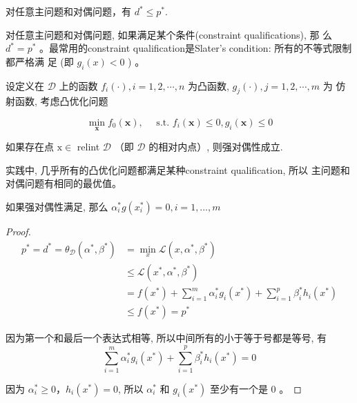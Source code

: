 \begin{theorem}[弱对偶性]
    对任意主问题和对偶问题，有 $ d^{*} \leqslant p^{*} $.
\end{theorem}

\begin{theorem}[强对偶性]
    对任意主问题和对偶问题, 如果满足某个条件(constraint qualifications), 那 么 $ d^{*}=p^{*} $ 。最常用的constraint qualification是Slater's condition: 所有的不等式限制都严格满 足 (即 $ g_{i}(x)<0 $ ) 。
\end{theorem}

\begin{theorem}[Slater 条件]
    设定义在 $ \mathcal{D} $ 上的函数 $ f_{i}(\cdot), i=1,2, \cdots, n $ 为凸函数, $ g_{j}(\cdot), j=1,2, \cdots, m $ 为 仿射函数, 考虑凸优化问题

    $$
    \min _{\mathbf{x}} f_{0}(\mathbf{x}), \quad \text { s.t. } f_{i}(\mathbf{x}) \leq 0, g_{i}(\mathbf{x}) \leq 0
    $$

    如果存在点 $ \mathrm{x} \in $ relint $ \mathcal{D} $ （即 $ \mathcal{D} $ 的相对内点）, 则强对偶性成立.
\end{theorem}

实践中, 几乎所有的凸优化问题都满足某种constraint qualification, 所以 主问题和对偶问题有相同的最优值。

\begin{theorem}
    如果强对偶性满足, 那么 $ \alpha_{i}^{*} g\left(x_{i}^{*}\right)=0, i=1, \ldots, m $
    
\end{theorem}

\begin{proof}
    $$
    \begin{aligned}
    p^{*}=d^{*}=\theta_{\mathcal{D}}\left(\alpha^{*}, \beta^{*}\right) &=\min _{x} \mathcal{L}\left(x, \alpha^{*}, \beta^{*}\right) \\
    & \leqslant \mathcal{L}\left(x^{*}, \alpha^{*}, \beta^{*}\right) \\
    &=f\left(x^{*}\right)+\sum_{i=1}^{m} \alpha_{i}^{*} g_{i}\left(x^{*}\right)+\sum_{i=1}^{p} \beta_{i}^{*} h_{i}\left(x^{*}\right) \\
    & \leqslant f\left(x^{*}\right)=p^{*}
    \end{aligned}
    $$

    因为第一个和最后一个表达式相等, 所以中间所有的小于等于号都是等号, 有 $$ \sum_{i=1}^{m} \alpha_{i}^{*} g_{i}\left(x^{*}\right)+\sum_{i=1}^{p} \beta_{i}^{*} h_{i}\left(x^{*}\right)=0 $$

    因为 $ \alpha_{i}^{*} \geqslant 0 ， h_{i}\left(x^{*}\right)=0 $, 所以 $ \alpha_{i}^{*} $ 和 $ g_{i}\left(x^{*}\right) $ 至少有一个是 0 。
\end{proof}

